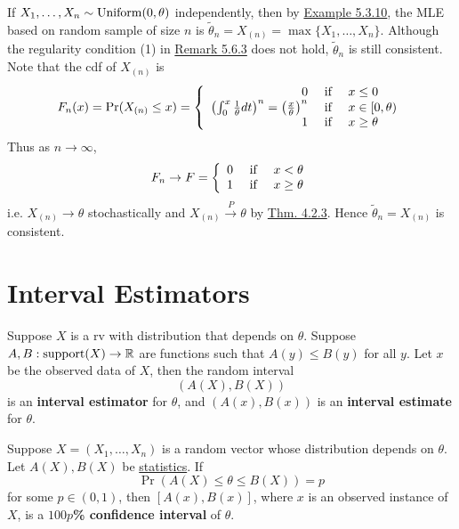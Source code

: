 \documentclass[11pt,fleqn]{book} %
\begin{document}
\begin{example} \label{eg:567}
If \(X_1, \ldots, X_n \sim \operatorname{Uniform}(0, \theta)\) independently, then by \hyperref[eg:5310]{Example 5.3.10}, the MLE based on random sample of size \(n\) is \(\tilde{\theta}_n = X_{(n)} = \max\{X_1, \ldots, X_n\}\). Although the regularity condition (1) in \hyperref[rmk:563]{Remark 5.6.3} does not hold, \(\tilde{\theta}_n\) is still consistent. Note that the cdf of \(X_{(n)}\) is
\[
F_n(x) = \Pr(X_{(n)} \leq x) = 
\left\{
\begin{array}{rcl}
0 & \text{ if } & x \leq 0 \\
\left(\int_0^x \frac1\theta dt\right)^n = \left(\frac{x}{\theta}\right)^n & \text{ if } & x \in [0, \theta) \\
1 & \text{ if } & x \geq \theta
\end{array}
\right.
\]
\indent Thus as \(n\rightarrow\infty\),
\[
F_n \rightarrow F = 
\left\{
\begin{array}{rcl}
0 & \text{ if } & x < \theta \\
1 & \text{ if } & x \geq \theta
\end{array}
\right.
\]
i.e. \(X_{(n)} \rightarrow \theta\) stochastically and \(X_{(n)} \xrightarrow{P} \theta\) by \hyperref[thm:423]{Thm. 4.2.3}. Hence \(\tilde{\theta}_n = X_{(n)}\) is consistent.
\end{example}


\section{Interval Estimators}

\begin{definition} \label{def:571}
Suppose \(X\) is a rv with distribution that depends on \(\theta\). Suppose \(A, B: \operatorname{support}(X)\rightarrow\mathbb{R}\) are functions such that \(A(y) \leq B(y)\) for all \(y\). Let \(x\) be the observed data of \(X\), then the random interval
\[
(A(X), B(X))
\]
is an \textbf{interval estimator} for \(\theta\), and \((A(x), B(x))\) is an \textbf{interval estimate} for \(\theta\).
\end{definition}

\begin{definition} \label{def:572}
Suppose \(X = (X_1, \ldots, X_n)\) is a random vector whose distribution depends on \(\theta\). Let \(A(X), B(X)\) be \hyperref[def:511]{statistics}. If
\[
\Pr(A(X) \leq \theta \leq B(X)) = p
\]
for some \(p \in (0, 1)\), then \([A(x), B(x)]\), where \(x\) is an observed instance of \(X\), is a \textbf{\(100p\)\% confidence interval} of \(\theta\).
\end{definition}
\end{document}
